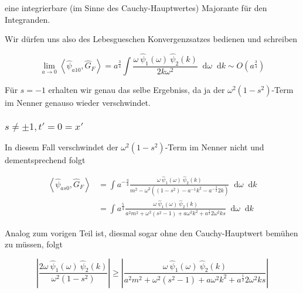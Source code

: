 \documentclass{scrartcl}
\renewcommand*\d{\mathop{}\!\mathrm{d}}
\begin{document}
eine integrierbare (im Sinne des Cauchy-Hauptwertes) Majorante für den Integranden.


Wir dürfen uns also des Lebesgueschen Konvergenzsatzes bedienen und schreiben

\begin{equation}
    \lim_{a \rightarrow 0} \left< \hat\psi_{a10}, \hat G_F \right> =
    a^\frac{3}{4} \int \frac{
    \omega ~\hat \psi_1(\omega) ~\hat \psi_2(k)
    }
    {
    2k \omega^2
    }
    \d \omega \d k
    \sim O(a^\frac{3}{4})
\end{equation}

Für $s = -1$ erhalten wir genau das selbe Ergebniss, da ja der $\omega^2 (1-s^2)$-Term
im Nenner genauso wieder verschwindet.

\subsubsection*{$s \neq \pm 1, t' = 0 = x'$}
In diesem Fall verschwindet der $\omega^2 (1-s^2)$-Term im Nenner nicht und
dementsprechend folgt

\begin{align*}
    \left< \hat\psi_{as0}, \hat G_F \right>
    &=
    \int a^{-\frac{3}{4}} \frac{
        \omega ~\hat \psi_1(\omega) ~\hat \psi_2(k)
    }
    {
        m^2-\omega^2 ((1-s^2) - a^{-1}k^2 - a^{-\frac{3}{2}}2 k )
    }
    \d \omega \d k \\
    &=
    \int a^{\frac{5}{4}} \frac{
        \omega ~\hat \psi_1(\omega) ~\hat \psi_2(k)
    }
    {
        a^2 m^2+\omega^2 (s^2-1) + a \omega^2 k^2 + a^\frac{1}{2}2 \omega^2 k s
    }
    \d \omega \d k
\end{align*}

Analog zum vorigen Teil ist, diesmal sogar ohne den Cauchy-Hauptwert bemühen zu
müssen, folgt


\begin{equation*}
    \left|
        \frac{2 \omega ~\hat \psi_1(\omega) ~\hat \psi_2(k)}{\omega^2 (1-s^2)}
    \right|
    \geq
    \left|
        \frac{
        \omega ~\hat \psi_1(\omega) ~\hat \psi_2(k)
    }
    {
        a^2 m^2+\omega^2 (s^2-1) + a \omega^2 k^2 + a^\frac{1}{2}2 \omega^2 k s
    }
    \right|
\end{equation*}
\end{document}
